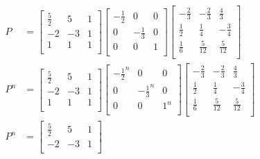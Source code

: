 \documentclass{article}
\begin{document}
\begin{align*}
    P
    &=
    \begin{bmatrix}
        \frac{5}{2} &  5 & 1 \\
                 -2 & -3 & 1 \\
                  1 &  1 & 1 \\
    \end{bmatrix}
    \begin{bmatrix}
        -\frac{1}{2} &            0 & 0 \\
                   0 & -\frac{1}{3} & 0 \\
                   0 &            0 & 1 \\
    \end{bmatrix}
    \begin{bmatrix}
        -\frac{2}{3} & -\frac{2}{3} & \frac{4}{3} \\
         \frac{1}{2} &  \frac{1}{4} & -\frac{3}{4} \\
         \frac{1}{6} & \frac{5}{12} & \frac{5}{12} \\
    \end{bmatrix} \\
    P^n
    &=
    \begin{bmatrix}
        \frac{5}{2} &  5 & 1 \\
                 -2 & -3 & 1 \\
                  1 &  1 & 1 \\
    \end{bmatrix}
    \begin{bmatrix}
        -\frac{1}{2}^n &              0 & 0 \\
                     0 & -\frac{1}{3}^n & 0 \\
                     0 &              0 & 1^n \\
    \end{bmatrix}
    \begin{bmatrix}
        -\frac{2}{3} & -\frac{2}{3} & \frac{4}{3} \\
         \frac{1}{2} &  \frac{1}{4} & -\frac{3}{4} \\
         \frac{1}{6} & \frac{5}{12} & \frac{5}{12} \\
    \end{bmatrix} \\
    P^n
    &=
    \begin{bmatrix}
        \frac{5}{2} &  5 & 1 \\
                 -2 & -3 & 1 \\

\end{bmatrix}
\end{align*}
\end{document}
